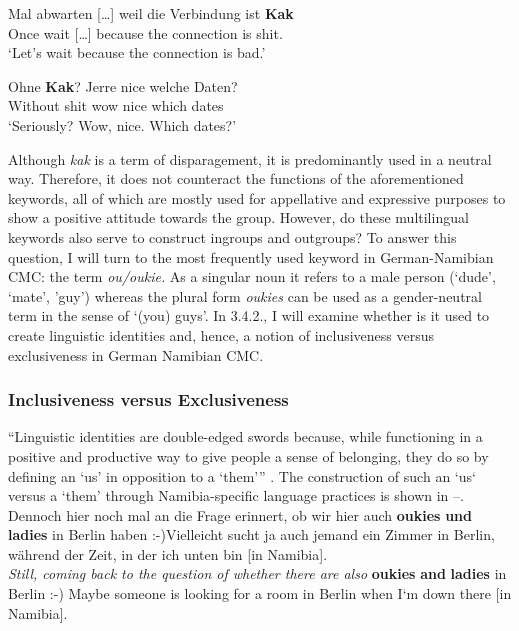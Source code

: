 \documentclass[output=paper]{langsci/langscibook}
\begin{document}
\ea\label{ex:radke:9}
	\gll Mal abwarten […] weil die Verbindung ist \textbf{Kak}\\
		Once wait […] because the connection is shit.\\
	\glt `Let’s wait because the connection is bad.'\\
\z

\ea\label{ex:radke:10}
	\gll Ohne \textbf{Kak}? Jerre nice welche Daten? \\
		Without shit wow nice which dates\\
	\glt `Seriously? Wow, nice. Which dates?'\\
\z

Although \textit{kak} is a term of disparagement, it is predominantly used in a neutral way. Therefore, it does not counteract the functions of the aforementioned keywords, all of which are mostly used for appellative and expressive purposes to show a positive attitude towards the group. However, do these multilingual keywords also serve to construct ingroups and outgroups? To answer this question, I will turn to the most frequently used keyword in German-Namibian CMC: the term \textit{ou/oukie.} As a singular noun it refers to a male person (‘dude’, ‘mate’, ’guy’) whereas the plural form \textit{oukies} can be used as a gender-neutral term in the sense of ‘(you) guys’. In 3.4.2., I will examine whether is it used to create linguistic identities and, hence, a notion of inclusiveness versus exclusiveness in German Namibian CMC.

 
  \subsubsection{Inclusiveness versus Exclusiveness}
 \label{sec:radke:3.4.2}

“Linguistic identities are double-edged swords because, while functioning in a positive and productive way to give people a sense of belonging, they do so by defining an ‘us’ in opposition to a ‘them’” \citep[261]{joseph_linguistic_2006}. The construction of such an ‘us‘ versus a ‘them’ through Namibia-specific language practices is shown in --.
\ea
\label{ex:radke:11}
Dennoch hier noch mal an die Frage erinnert, ob wir hier auch \textbf{oukies} \textbf{und} \textbf{ladies} in Berlin haben :-)Vielleicht sucht ja auch jemand ein Zimmer in Berlin, während der Zeit, in der ich unten bin [in Namibia].\\
\textit{Still, coming back to the question of whether there are also} \textbf{oukies} \textbf{and} \textbf{ladies} in Berlin :-) Maybe someone is looking for a room in Berlin when I‘m down there [in Namibia].\\
\z
\end{document}
